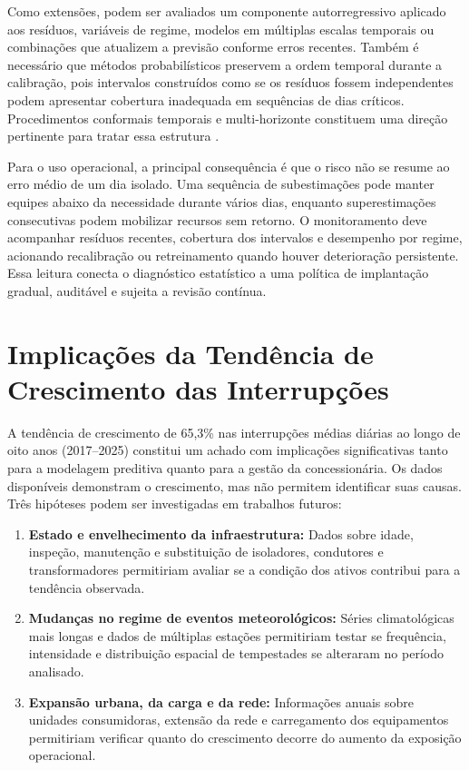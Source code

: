 Como extensões, podem ser avaliados um componente autorregressivo aplicado aos resíduos, variáveis de regime, modelos em múltiplas escalas temporais ou combinações que atualizem a previsão conforme erros recentes. Também é necessário que métodos probabilísticos preservem a ordem temporal durante a calibração, pois intervalos construídos como se os resíduos fossem independentes podem apresentar cobertura inadequada em sequências de dias críticos. Procedimentos conformais temporais e multi-horizonte constituem uma direção pertinente para tratar essa estrutura \cite{wang2024conformal}.

Para o uso operacional, a principal consequência é que o risco não se resume ao erro médio de um dia isolado. Uma sequência de subestimações pode manter equipes abaixo da necessidade durante vários dias, enquanto superestimações consecutivas podem mobilizar recursos sem retorno. O monitoramento deve acompanhar resíduos recentes, cobertura dos intervalos e desempenho por regime, acionando recalibração ou retreinamento quando houver deterioração persistente. Essa leitura conecta o diagnóstico estatístico a uma política de implantação gradual, auditável e sujeita a revisão contínua.

\section{Implicações da Tendência de Crescimento das Interrupções}

A tendência de crescimento de 65,3\% nas interrupções médias diárias ao longo de oito anos (2017--2025) constitui um achado com implicações significativas tanto para a modelagem preditiva quanto para a gestão da concessionária. Os dados disponíveis demonstram o crescimento, mas não permitem identificar suas causas. Três hipóteses podem ser investigadas em trabalhos futuros:

\begin{enumerate}
    \item \textbf{Estado e envelhecimento da infraestrutura:} Dados sobre idade, inspeção, manutenção e substituição de isoladores, condutores e transformadores permitiriam avaliar se a condição dos ativos contribui para a tendência observada.

    \item \textbf{Mudanças no regime de eventos meteorológicos:} Séries climatológicas mais longas e dados de múltiplas estações permitiriam testar se frequência, intensidade e distribuição espacial de tempestades se alteraram no período analisado.

    \item \textbf{Expansão urbana, da carga e da rede:} Informações anuais sobre unidades consumidoras, extensão da rede e carregamento dos equipamentos permitiriam verificar quanto do crescimento decorre do aumento da exposição operacional.
\end{enumerate}

